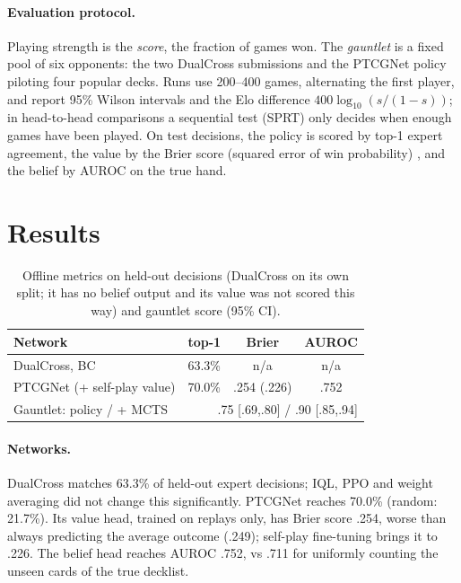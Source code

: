 \documentclass{article}
\begin{document}
\paragraph*{Evaluation protocol.}\label{sec:eval}
Playing strength is the \emph{score}, the fraction of games won. The \emph{gauntlet} is a fixed pool of six opponents: the two DualCross submissions and the PTCGNet policy piloting four popular decks. Runs use 200--400 games, alternating the first player, and report 95\% Wilson intervals \cite{wilson1927probable} and the Elo difference $400\log_{10}(s/(1-s))$; in head-to-head comparisons a sequential test (SPRT) \cite{wald1945sequential} only decides when enough games have been played. On test decisions, the policy is scored by top-1 expert agreement, the value by the Brier score (squared error of win probability) \cite{brier1950verification}, and the belief by AUROC on the true hand.

\section{Results}
\begin{table}[t]
\caption{Offline metrics on held-out decisions (DualCross on its own split; it has no belief output and its value was not scored this way) and gauntlet score (95\% CI).}
\label{tab:gen}
\begin{center}
\begin{small}
\begin{tabular}{@{}lccc@{}}
\toprule
Network & top-1 & Brier & AUROC \\
\midrule
DualCross, BC & 63.3\% & n/a & n/a \\
PTCGNet (+ self-play value) & 70.0\% & .254 (.226) & .752 \\
\midrule
Gauntlet: policy / + MCTS & \multicolumn{3}{r}{.75 [.69,.80] / .90 [.85,.94]} \\
\bottomrule
\end{tabular}
\end{small}
\end{center}
\vspace{-0.4cm}
\end{table}

\paragraph*{Networks.} DualCross matches 63.3\% of held-out expert decisions; IQL, PPO and weight averaging did not change this significantly. PTCGNet reaches 70.0\% (random: 21.7\%). Its value head, trained on replays only, has Brier score .254, worse than always predicting the average outcome (.249); self-play fine-tuning brings it to .226. The belief head reaches AUROC .752, vs .711 for uniformly counting the unseen cards of the true decklist.
\end{document}
